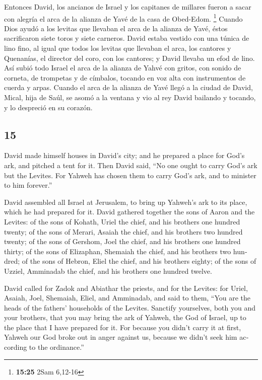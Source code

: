 \begin{paracol}{2}
 Entonces David, los ancianos de Israel y los capitanes
de millares fueron a sacar con alegría el arca de la alianza de Yavé de
la casa de Obed-Edom. \footnote{\textbf{15:25} 2Sam 6,12-16}
 Cuando Dios ayudó a los levitas que llevaban el arca de
la alianza de Yavé, éstos sacrificaron siete toros y siete carneros.
 David estaba vestido con una túnica de lino fino, al
igual que todos los levitas que llevaban el arca, los cantores y
Quenanías, el director del coro, con los cantores; y David llevaba un
efod de lino.  Así subió todo Israel el arca de la
alianza de Yahvé con gritos, con sonido de corneta, de trompetas y de
címbalos, tocando en voz alta con instrumentos de cuerda y arpas.
 Cuando el arca de la alianza de Yavé llegó a la ciudad
de David, Mical, hija de Saúl, se asomó a la ventana y vio al rey David
bailando y tocando, y lo despreció en su corazón.

\switchcolumn
\begin{otherlanguage}{english}

\hypertarget{section-29}{%
\section{15}\label{section-29}}

 David made himself houses in David's city; and he
prepared a place for God's ark, and pitched a tent for it.
 Then David said, ``No one ought to carry God's ark but
the Levites. For Yahweh has chosen them to carry God's ark, and to
minister to him forever.''

 David assembled all Israel at Jerusalem, to bring up
Yahweh's ark to its place, which he had prepared for it. 
David gathered together the sons of Aaron and the Levites:
 of the sons of Kohath, Uriel the chief, and his brothers
one hundred twenty;  of the sons of Merari, Asaiah the
chief, and his brothers two hundred twenty;  of the sons
of Gershom, Joel the chief, and his brothers one hundred thirty;
 of the sons of Elizaphan, Shemaiah the chief, and his
brothers two hundred;  of the sons of Hebron, Eliel the
chief, and his brothers eighty;  of the sons of Uzziel,
Amminadab the chief, and his brothers one hundred twelve.

 David called for Zadok and Abiathar the priests, and for
the Levites: for Uriel, Asaiah, Joel, Shemaiah, Eliel, and Amminadab,
 and said to them, ``You are the heads of the fathers'
households of the Levites. Sanctify yourselves, both you and your
brothers, that you may bring the ark of Yahweh, the God of Israel, up to
the place that I have prepared for it.  For because you
didn't carry it at first, Yahweh our God broke out in anger against us,
because we didn't seek him according to the ordinance.''


\end{otherlanguage}
\end{paracol}
